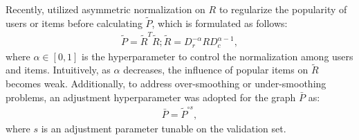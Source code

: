 \documentclass[a4paper,fleqn]{cas-sc}
\renewcommand{\cite}{\citep}
\begin{document}
Recently, \cite{DBLP:conf/sigir/ParkSS24, DBLP:conf/www/ParkYS25, DBLP:conf/www/KimCPS25} utilized asymmetric normalization on $R$ to regularize the popularity of users or items before calculating $\tilde P$, which is formulated as follows:
\begin{equation}
\label{asymmetric_normalization_on_R}
\begin{aligned}
    \tilde{P}=\tilde{R}^T\tilde{R} ; \tilde R = D_r^{-\alpha}RD_c^{\alpha-1},
\end{aligned}
\end{equation}
where $\alpha \in [0,1]$ is the hyperparameter to control the normalization among users and items. Intuitively, as $\alpha$ decreases, the influence of popular items on $\tilde R$ becomes weak. Additionally, to address over-smoothing or under-smoothing problems, an adjustment hyperparameter was adopted for the graph $\bar P$ as:
\begin{equation}
\label{Adjustment_for_P}
\begin{aligned}
    \bar{P}=\tilde P^{\circ s},
\end{aligned}
\end{equation}
where $s$ is an adjustment parameter tunable on the validation set.
\end{document}

